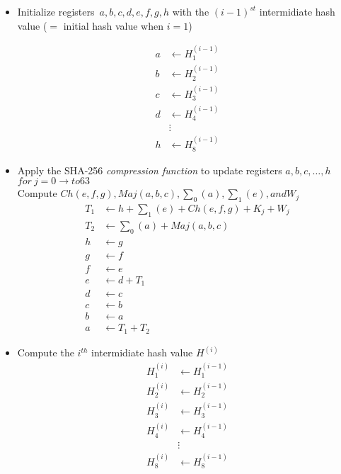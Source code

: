 \documentclass{report}
\begin{document}
\begin{itemize}
	\item{Initialize registers\ $ a, b, c, d, e, f, g, h $}
		with the $(i- 1)^{st}$ intermidiate hash value ($=$ initial hash value when $i = 1$)

		\begin{align*}
			a &\leftarrow H_{1}^{(i - 1)} \\
			b &\leftarrow H_{2}^{(i - 1)} \\
			c &\leftarrow H_{3}^{(i - 1)} \\
			d &\leftarrow H_{4}^{(i - 1)} \\
				&\vdots \\
			h &\leftarrow H_{8}^{(i - 1)}
		\end{align*}

	\item{Apply the SHA-256 \textit{compression function} to update registers $a, b, c, \ldots, h$} \\
		$for\ j = 0 \rightarrow to 63$ \\
		Compute $Ch(e,f,g), Maj(a,b,c), \sum_{0}{(a)}, \sum_{1}{(e)}, and W_{j}$
		\begin{align*}
			T_1 &\leftarrow h + \sum_{1}{(e)} + Ch(e, f, g) + K_{j} + W_{j} \\
			T_2 &\leftarrow \sum_{0}{(a)} + Maj(a, b, c) \\
			h &\leftarrow g \\ 
			g &\leftarrow f \\ 
			f &\leftarrow e \\ 
			e &\leftarrow d + T_{1} \\ 
			d &\leftarrow c \\ 
			c &\leftarrow b \\ 
			b &\leftarrow a \\ 
			a &\leftarrow T_{1} + T_{2}
		\end{align*}
	\item{Compute the $i^{th}$ intermidiate hash value $H^{(i)}$}
		\begin{align*}
			H_{1}^{(i)} &\leftarrow H_{1}^{(i - 1)} \\
			H_{2}^{(i)} &\leftarrow H_{2}^{(i - 1)} \\
			H_{3}^{(i)} &\leftarrow H_{3}^{(i - 1)} \\
			H_{4}^{(i)} &\leftarrow H_{4}^{(i - 1)} \\
									&\vdots \\
			H_{8}^{(i)} &\leftarrow H_{8}^{(i - 1)}
		\end{align*}
\end{itemize}
\end{document}
